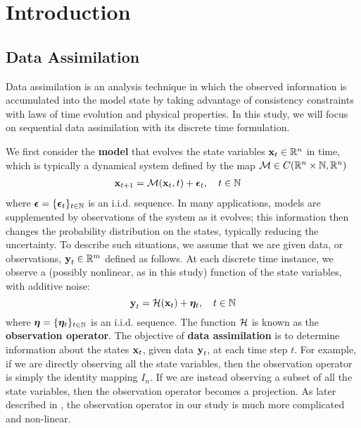 





\chapter{Introduction}

\section{Data Assimilation}\label{sec:IntroDA}
\par Data assimilation is an analysis technique in which the observed information is accumulated into the model state by taking advantage of consistency constraints with laws of time evolution and physical properties. In this study, we will focus on sequential data assimilation with its discrete time formulation.\par

We first consider the \textbf{model} that evolves the state variables $\textbf{x}_t\in\mathbb{R}^n$ in time, which is typically a dynamical system defined by the map $\mathcal{M}\in C(\mathbb{R}^n\times\mathbb{N},\mathbb{R}^n)$
\begin{align}
& \textbf{x}_{t+1} = \mathcal{M}(\textbf{x}_t,t) + \bm{\epsilon}_t, \quad t\in\mathbb{N} \label{eq:DAmodel}
\end{align}
where $\bm{\epsilon}=\{\bm{\epsilon}_t\}_{t\in\mathbb{N}}$ is an i.i.d. sequence. In many applications, models are supplemented by observations of the system as it evolves; this information then changes the probability distribution on the states, typically reducing the uncertainty. To describe such situations, we assume that we are given data, or observations, $\textbf{y}_t\in\mathbb{R}^m$ defined as follows. At each discrete time instance, we observe a (possibly nonlinear, as in this study) function of the state variables, with additive noise:
\begin{equation}
\textbf{y}_t = \mathcal{H}(\textbf{x}_t) + \bm{\eta}_t, \quad t\in\mathbb{N} \label{eq:DAobservation}
\end{equation}
where $\bm{\eta}=\{\bm{\eta}_t\}_{t\in\mathbb{N}}$ is an i.i.d. sequence. The function $\mathcal{H}$ is known as the \textbf{observation operator}. The objective of \textbf{data assimilation} is to determine information about the states $\textbf{x}_t$, given data $\textbf{y}_t$, at each time step $t$. For example, if we are directly observing all the state variables, then the observation operator is simply the identity mapping $I_n$. If we are instead observing a subset of all the state variables, then the observation operator becomes a projection. As later described in , the observation operator in our study is much more complicated and non-linear.\par

